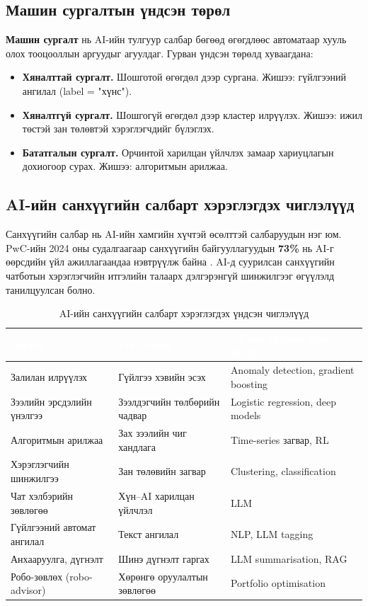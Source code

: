 \subsection{Машин сургалтын үндсэн төрөл}
\textbf{Машин сургалт} нь AI-ийн тулгуур салбар бөгөөд өгөгдлөөс автоматаар хууль олох тооцооллын аргуудыг агуулдаг. Гурван үндсэн төрөлд хуваагдана:
\begin{itemize}
    \item [1.] \textbf{Хяналттай сургалт.} Шошготой өгөгдөл дээр сургана. Жишээ: гүйлгээний ангилал (label = "хүнс").
    \item [2.] \textbf{Хяналтгүй сургалт.} Шошгогүй өгөгдөл дээр кластер илрүүлэх. Жишээ: ижил төстэй зан төлөвтэй хэрэглэгчдийг бүлэглэх.
    \item [3.] \textbf{Бататгалын сургалт.} Орчинтой харилцан үйлчлэх замаар хариуцлагын дохиогоор сурах. Жишээ: алгоритмын арилжаа.
\end{itemize}

\subsection{AI-ийн санхүүгийн салбарт хэрэглэгдэх чиглэлүүд}
Санхүүгийн салбар нь AI-ийн хамгийн хүчтэй өсөлттэй салбаруудын нэг юм. PwC-ийн 2024 оны судалгаагаар санхүүгийн байгууллагуудын \textbf{73\%} нь AI-г өөрсдийн үйл ажиллагаандаа нэвтрүүлж байна \cite{pwc_ai_finance, aifinance}. AI-д суурилсан санхүүгийн чатботын хэрэглэгчийн итгэлийн талаарх дэлгэрэнгүй шинжилгээг \cite{chatbotfin} өгүүлэлд танилцуулсан болно.

\begin{table}[ht]
\centering
\footnotesize
\renewcommand{\arraystretch}{1.3}
\begin{tabular}{|p{3.2cm}|p{4.2cm}|p{4.5cm}|}
\hline
\rowcolor{darknavy}
\textcolor{white}{\textbf{Чиглэл}} & \textcolor{white}{\textbf{Гол асуудал}} & \textcolor{white}{\textbf{AI-ийн оруулах хувь нэмэр}} \\ \hline
Залилан илрүүлэх           & Гүйлгээ хэвийн эсэх       & Anomaly detection, gradient boosting \\ \hline
Зээлийн эрсдэлийн үнэлгээ  & Зээлдэгчийн төлбөрийн чадвар & Logistic regression, deep models \\ \hline
Алгоритмын арилжаа         & Зах зээлийн чиг хандлага  & Time-series загвар, RL \\ \hline
Хэрэглэгчийн шинжилгээ        & Зан төлөвийн загвар        & Clustering, classification \\ \hline
Чат хэлбэрийн зөвлөгөө     & Хүн--AI харилцан үйлчлэл  & LLM \\ \hline
Гүйлгээний автомат ангилал & Текст ангилал         & NLP, LLM tagging \\ \hline
Анхааруулга, дүгнэлт       & Шинэ дүгнэлт гаргах       & LLM summarisation, RAG \\ \hline
Робо-зөвлөх (robo-advisor) & Хөрөнгө оруулалтын зөвлөгөө & Portfolio optimisation \\ \hline
\end{tabular}
\caption{AI-ийн санхүүгийн салбарт хэрэглэгдэх үндсэн чиглэлүүд}
\label{tab:ai-finance}
\end{table}

